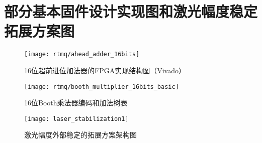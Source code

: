 
\chapter{部分基本固件设计实现图和激光幅度稳定拓展方案图}

\begin{figure}
    \centering
    \texttt{[image: rtmq/ahead\_adder\_16bits]}
    \caption[16位超前进位加法器的FPGA实现结构图]{16位超前进位加法器的FPGA实现结构图（Vivado）\label{fig:ahead_adder_16bits}}
\end{figure}


\begin{figure}
    \centering
    \texttt{[image: rtmq/booth\_multiplier\_16bits\_basic]}
    \caption[16位Booth乘法器编码和加法树表]{16位Booth乘法器编码和加法树表\label{fig:booth_multiplier_32bits_basic}}
\end{figure}

\begin{figure}
    \centering
    \texttt{[image: laser\_stabilization1]}
    \caption[激光幅度外部稳定的拓展方案架构图]{激光幅度外部稳定的拓展方案架构图\label{fig:laser_stabilization}}
\end{figure}

